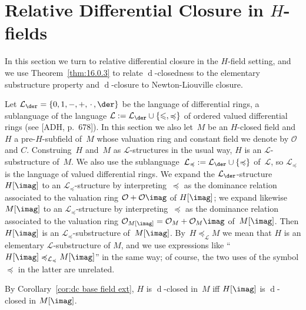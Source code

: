 \documentclass[]{amsart}
\numberwithin{equation}{section}
\def \d{\operatorname{d}}
\theoremstyle{definition}
\theoremstyle{remark}
\renewcommand\leq{\leqslant}
\renewcommand\preceq{\preccurlyeq}
\renewcommand\le{\leq}
\begin{document}
 

\section{Relative Differential Closure in $H$-fields}\label{sec:diff cl H-fields}

\noindent
In this section we turn to relative differential closure in the $H$-field setting, and
we use Theorem~\ref{thm:16.0.3} to relate $\d$-closedness to the elementary substructure property
and $\d$-closure to Newton-Liouville closure.

Let $\mathcal L_\der=\{0,1,{-},{+},{\,\cdot\,},{\der}\}$  be the language of differential rings, 
a sublanguage of the language $\mathcal L:=\mathcal{L}_\der \cup\{\le, \preceq\}$ of ordered valued differential rings (see [ADH, p.~678]). 
 In  this section we  also let~$M$ be an $H$-closed field  and
$H$ a pre-$H$-subfield of~$M$ whose valuation ring and constant field we denote by $\mathcal{O}$ and $C$.
Construing~$H$ and~$M$ as $\mathcal L$-structures in the usual way,
$H$ is an $\mathcal L$-substructure of~$M$.
We also use the sublanguage~$\mathcal L_{\preceq}:=\mathcal L_\der\cup\{ {\preceq} \}$ of~$\mathcal L$, so $\mathcal L_{\preceq}$ is the language of valued differential rings. We
expand the $\mathcal L_\der$-structure~$H[\imag]$ to an   $\mathcal L_{\preceq}$-structure by interpreting~$\preceq$ 
as the dominance relation associated to the valuation ring $\mathcal O+\mathcal O\imag$ of $H[\imag]$;
we expand likewise~$M[\imag]$ to an   $\mathcal L_{\preceq}$-structure by interpreting~$\preceq$ 
as the dominance relation associated to the valuation ring $\mathcal O_{M[\imag]}=\mathcal O_M+\mathcal O_M\imag$ of~$M[\imag]$. 
Then $H[\imag]$ is an $\mathcal L_{\preceq}$-substructure of~$M[\imag]$.
By~$H\preceq_{\mathcal{L}} M$ we mean that $H$ is an elementary $\mathcal L$-substructure of $M$, and we use expressions like ``$H[\imag]\preceq_{\mathcal{L}_{\preceq}} M[\imag]$''  in the same way; of course, the two
uses of the symbol $\preceq$ in the latter are unrelated. 

By 
Corollary~\ref{cor:dc base field ext}, $H$ is $\d$-closed in~$M$ iff $H[\imag]$ is $\d$-closed in $M[\imag]$. 
\end{document}

